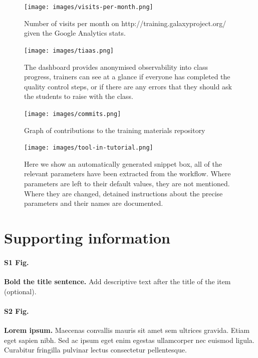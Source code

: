 \documentclass[10pt,letterpaper]{article}
\begin{document}
\begin{figure}[!ht]
	\centering
	\texttt{[image: images/visits-per-month.png]}
	\caption{Number of visits per month on http://training.galaxyproject.org/ given the Google Analytics stats.\label{fig:visits}}
\end{figure}

\begin{figure}[!ht]
	\centering
	\texttt{[image: images/tiaas.png]}
	\caption{The dashboard provides anonymised observability into class progress, trainers can see at a glance if everyone has completed the quality control steps, or if there are any errors that they should ask the students to raise with the class.\label{fig:tiaas}}
\end{figure}

\begin{figure}[!ht]
	\centering
	\texttt{[image: images/commits.png]}
	\caption{Graph of contributions to the training materials repository\label{fig:contributions}}
\end{figure}

\begin{figure}[!ht]
	\centering
	\texttt{[image: images/tool-in-tutorial.png]}
	\caption{Here we show an automatically generated snippet box, all of the relevant parameters have been extracted from the workflow. Where parameters are left to their default values, they are not mentioned. Where they are changed, detained instructions about the precise parameters and their names are documented.\label{fig:planemo}}
\end{figure}

\section*{Supporting information}

\paragraph*{S1 Fig.}
\label{S1_Fig}
{\bf Bold the title sentence.} Add descriptive text after the title of the item (optional).

\paragraph*{S2 Fig.}
\label{S2_Fig}
{\bf Lorem ipsum.} Maecenas convallis mauris sit amet sem ultrices gravida. Etiam eget sapien nibh. Sed ac ipsum eget enim egestas ullamcorper nec euismod ligula. Curabitur fringilla pulvinar lectus consectetur pellentesque.
\end{document}

